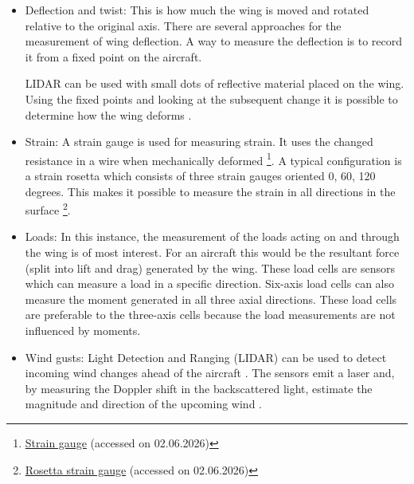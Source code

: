 \begin{itemize}
    \item Deflection and twist: This is how much the wing is moved and rotated relative to the original axis. There are several approaches for the measurement of wing deflection. A way to measure the deflection is to record it from a fixed point on the aircraft. 

    LIDAR can be used with small dots of reflective material placed on the wing.  Using the fixed points and looking at the subsequent change it is possible to determine how the wing deforms \cite{opt5010011} \cite{LopezHerreros2024}.  
    
    \item Strain: A strain gauge is used for measuring strain. It uses the changed resistance in a wire when mechanically deformed \footnote{\href{https://www.sciencedirect.com/topics/earth-and-planetary-sciences/strain-gauge}{Strain gauge} (accessed on 02.06.2026)}. A typical configuration is a strain rosetta which consists of three strain gauges oriented 0, 60, 120 degrees. This makes it possible to measure the strain in all directions in the surface   \footnote{\href{https://intertechnology.com/Vishay/pdfs/TechNotes_TechTips/TN-515.pdf}{Rosetta strain gauge} (accessed on 02.06.2026)}.  
    
    \item Loads: In this instance, the measurement of the loads acting on and through the wing is of most interest. For an aircraft this would be the resultant force (split into lift and drag) generated by the wing. These load cells are sensors which can measure a load in a specific direction. Six-axis load cells can also measure the moment generated in all three axial directions. These load cells are preferable to the three-axis cells because the load measurements are not influenced by moments.
    \item Wind gusts: Light Detection and Ranging (LIDAR) can be used to detect incoming wind changes ahead of the aircraft \cite{Schroeder2020}. The sensors emit a laser and, by measuring the Doppler shift in the backscattered light, estimate the magnitude and direction of the upcoming wind \cite{YEW2025101127}. 


\end{itemize}
